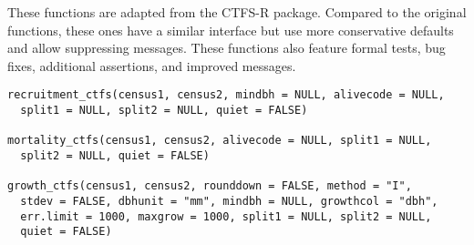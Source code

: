 \documentclass[a4paper]{book}
\begin{document}
%
\begin{Examples}
\end{Examples}
%
\begin{Description}\relax
These functions are adapted from the CTFS-R package. Compared to the
original functions, these ones have a similar interface but use more
conservative defaults and allow suppressing messages. These functions also
feature formal tests, bug fixes, additional assertions, and improved
messages.
\end{Description}
%
\begin{Usage}
\begin{verbatim}
recruitment_ctfs(census1, census2, mindbh = NULL, alivecode = NULL,
  split1 = NULL, split2 = NULL, quiet = FALSE)

mortality_ctfs(census1, census2, alivecode = NULL, split1 = NULL,
  split2 = NULL, quiet = FALSE)

growth_ctfs(census1, census2, rounddown = FALSE, method = "I",
  stdev = FALSE, dbhunit = "mm", mindbh = NULL, growthcol = "dbh",
  err.limit = 1000, maxgrow = 1000, split1 = NULL, split2 = NULL,
  quiet = FALSE)
\end{verbatim}
\end{Usage}
%
\end{document}
